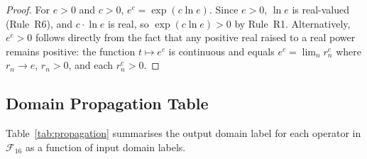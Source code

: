 \documentclass[12pt,a4paper]{article}
\theoremstyle{definition}
\begin{document}
\begin{proof}
For $e > 0$ and $c > 0$, $e^c = \exp(c \ln e)$.  Since $e > 0$, $\ln e$ is
real-valued (Rule~R6), and $c \cdot \ln e$ is real, so $\exp(c \ln e) > 0$ by
Rule~R1.  Alternatively, $e^c > 0$ follows directly from the fact that any
positive real raised to a real power remains positive: the function $t \mapsto
e^c$ is continuous and equals $e^c = \lim_{n} r_n^c$ where $r_n \to e$,
$r_n > 0$, and each $r_n^c > 0$.
\end{proof}

\subsection{Domain Propagation Table}
\label{sec:prop-table}

Table~\ref{tab:propagation} summarises the output domain label for each operator
in $\mathcal{F}_{16}$ as a function of input domain labels.
\end{document}
